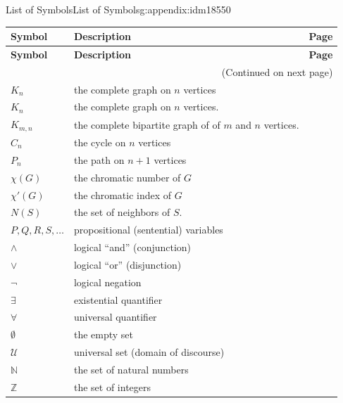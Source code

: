 \documentclass[oneside,10pt,]{book}
\numberwithin{equation}{chapter}
\def\N{\mathbb N}
\def\Z{\mathbb Z}
\def\U{\mathcal U}
\begin{document}
\begin{appendixptx}{List of Symbols}{}{List of Symbols}{}{}{g:appendix:idm18550}
\begin{longtable}[l]{lp{}r}
\addtocounter{table}{-1}
\textbf{Symbol}&\textbf{Description}&\textbf{Page}\\[1em]
\endfirsthead
\textbf{Symbol}&\textbf{Description}&\textbf{Page}\\[1em]
\endhead
\multicolumn{3}{r}{(Continued on next page)}\\
\endfoot
\endlastfoot
\(K_n\)&the complete graph on \(n\) vertices&\pageref{g:notation:idm8912}\\
\(K_n\)&the complete graph on \(n\) vertices.&\pageref{g:notation:idm8965}\\
\(K_{m,n}\)&the complete bipartite graph of of \(m\) and \(n\) vertices.&\pageref{g:notation:idm8975}\\
\(C_n\)&the cycle on \(n\) vertices&\pageref{g:notation:idm8985}\\
\(P_n\)&the path on \(n+1\) vertices&\pageref{g:notation:idm8995}\\
\(\chi(G)\)&the chromatic number of \(G\)&\pageref{g:notation:idm10472}\\
\(\chi'(G)\)&the chromatic index of \(G\)&\pageref{g:notation:idm10861}\\
\(N(S)\)&the set of neighbors of \(S\).&\pageref{g:notation:idm11108}\\
\(
                    P, Q, R, S, \ldots
                \)&propositional (sentential) variables&\pageref{g:notation:idm11947}\\
\(\wedge\)&logical ``and'' (conjunction)&\pageref{g:notation:idm11970}\\
\(\vee\)&logical ``or'' (disjunction)&\pageref{g:notation:idm11985}\\
\(\neg\)&logical negation&\pageref{g:notation:idm12030}\\
\(\exists\)&existential quantifier&\pageref{g:notation:idm12500}\\
\(\forall\)&universal quantifier&\pageref{g:notation:idm12513}\\
\(\emptyset\)&the empty set&\pageref{g:notation:idm12952}\\
\(\U\)&universal set (domain of discourse)&\pageref{g:notation:idm12962}\\
\(\N\)&the set of natural numbers&\pageref{g:notation:idm12970}\\
\(\Z\)&the set of integers&\pageref{g:notation:idm12982}\\

\end{longtable}
\end{appendixptx}
\end{document}
